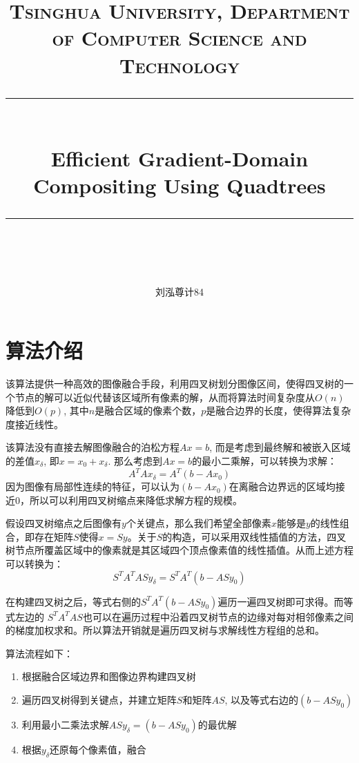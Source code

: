 \documentclass[UTF8, onecolumn, a4paper]{article}
\title{	
	\normalfont\normalsize
	\textsc{Tsinghua University, Department of Computer Science and Technology}\\ %
	\vspace{15pt} %
	\rule{\linewidth}{2.0pt}\\ %
	\vspace{17pt} %
	{\LARGE \textbf{Efficient Gradient-Domain Compositing Using Quadtrees}}\\ %
	\vspace{4pt} %
	\rule{\linewidth}{1.5pt}\\ %
	\vspace{2pt} %
}
\author{刘泓尊\quad 2018011446\quad 计84}
\begin{document}
\maketitle
{}

\section{算法介绍}
该算法\cite{quadtree}提供一种高效的图像融合手段，利用四叉树划分图像区间，使得四叉树的一个节点的解可以近似代替该区域所有像素的解，从而将算法时间复杂度从$O(n)$降低到$O(p)$, 其中$n$是融合区域的像素个数，$p$是融合边界的长度，使得算法复杂度接近线性。

该算法没有直接去解图像融合的泊松方程$Ax = b$, 而是考虑到最终解和被嵌入区域的差值$x_{\delta}$, 即$x = x_0 + x_{\delta}$. 
那么考虑到$Ax = b$的最小二乘解，可以转换为求解：
$$A^TAx_{\delta} = A^T(b - Ax_0)$$
因为图像有局部性连续的特征，可以认为$(b - Ax_0)$在离融合边界远的区域均接近0，所以可以利用四叉树缩点来降低求解方程的规模。

假设四叉树缩点之后图像有$y$个关键点，那么我们希望全部像素$x$能够是$y$的线性组合，即存在矩阵$S$使得$x = Sy$。关于$S$的构造，可以采用双线性插值的方法，四叉树节点所覆盖区域中的像素就是其区域四个顶点像素值的线性插值。从而上述方程可以转换为：
$$S^TA^TASy_{\delta} = S^TA^T(b - ASy_0)$$

在构建四叉树之后，等式右侧的$S^TA^T(b - ASy_0)$遍历一遍四叉树即可求得。而等式左边的 $S^TA^TAS$也可以在遍历过程中沿着四叉树节点的边缘对每对相邻像素之间的梯度加权求和。所以算法开销就是遍历四叉树与求解线性方程组的总和。

算法流程如下：
\begin{enumerate}
	\item 根据融合区域边界和图像边界构建四叉树
	\item 遍历四叉树得到关键点，并建立矩阵$S$和矩阵$AS$, 以及等式右边的$(b - ASy_0)$
	\item 利用最小二乘法求解$ASy_{\delta} = (b - ASy_0)$的最优解
	\item 根据$y_{\delta}$还原每个像素值，融合
\end{enumerate}
\end{document}

